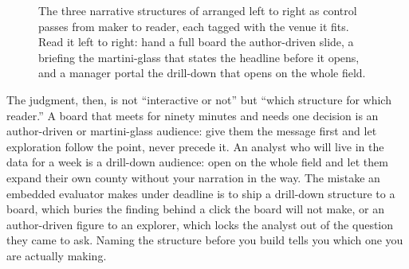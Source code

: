 \begin{figure}[htbp]
\centering
{}
\caption[Narrative structures on the control spectrum]{The three narrative structures of \textcite{segel2010narrative} arranged left to right as control passes from maker to reader, each tagged with the venue it fits. Read it left to right: hand a full board the author-driven slide, a briefing the martini-glass that states the headline before it opens, and a manager portal the drill-down that opens on the whole field.}
\label{fig:ch10-viz-spectrum}
\end{figure}

The judgment, then, is not \enquote{interactive or not} but \enquote{which structure for which reader.} A board that meets for ninety minutes and needs one decision is an author-driven or martini-glass audience: give them the message first and let exploration follow the point, never precede it. An analyst who will live in the data for a week is a drill-down audience: open on the whole field and let them expand their own county without your narration in the way. The mistake an embedded evaluator makes under deadline is to ship a drill-down structure to a board, which buries the finding behind a click the board will not make, or an author-driven figure to an explorer, which locks the analyst out of the question they came to ask. Naming the structure before you build tells you which one you are actually making.

